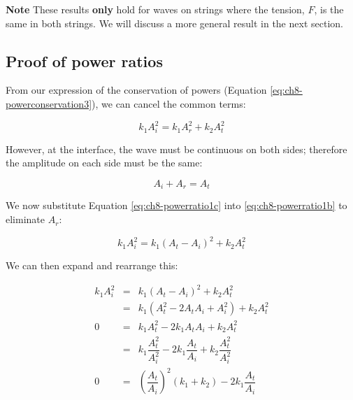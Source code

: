 \documentclass[
]{book}
\begin{document}
\textbf{Note} These results \textbf{only} hold for waves on strings where the tension, \(F\), is the same in both strings. We will discuss a more general result in the next section.

\hypertarget{proof-of-power-ratios}{%
\subsection*{Proof of power ratios}\label{proof-of-power-ratios}}

From our expression of the conservation of powers (Equation \eqref{eq:ch8-powerconservation3}), we can cancel the common terms:

\begin{equation}
k_1  A_i^2  =  k_1  A_r^2 +  k_2  A_t^2
\label{eq:ch8-powerratio1b}
\end{equation}

However, at the interface, the wave must be continuous on both sides; therefore the amplitude on each side must be the same:

\begin{equation}
A_i + A_r  =  A_t
\label{eq:ch8-powerratio1c}
\end{equation}

We now substitute Equation \eqref{eq:ch8-powerratio1c} into \eqref{eq:ch8-powerratio1b} to eliminate \(A_r\):

\begin{equation}
k_1  A_i^2  =  k_1  (A_t - A_i)^2 +  k_2  A_t^2
\label{eq:ch8-powerratio1d}
\end{equation}

We can then expand and rearrange this:

\begin{equation}
\begin{array}{rcl}
k_1  A_i^2  &=&  k_1  (A_t - A_i)^2 +  k_2  A_t^2\\
            &=& k_1 (A_t^2 - 2A_t A_i + A_i^2) + k_2  A_t^2 \\
    0       &=& k_1 A_t^2 - 2 k_1 A_t A_i + k_2  A_t^2 \\
            &=& k_1\dfrac{A_t^2}{A_i^2} - 2 k_1 \dfrac{A_t}{A_i} + k_2 \dfrac{A_t^2}{A_i^2} \\
    0       &=& \left(\dfrac{A_t}{A_i} \right)^2 (k_1 + k_2) - 2 k_1 \dfrac{A_t}{A_i} \\
\end{array}
\label{eq:ch8-powerratio1e}
\end{equation}
\end{document}

